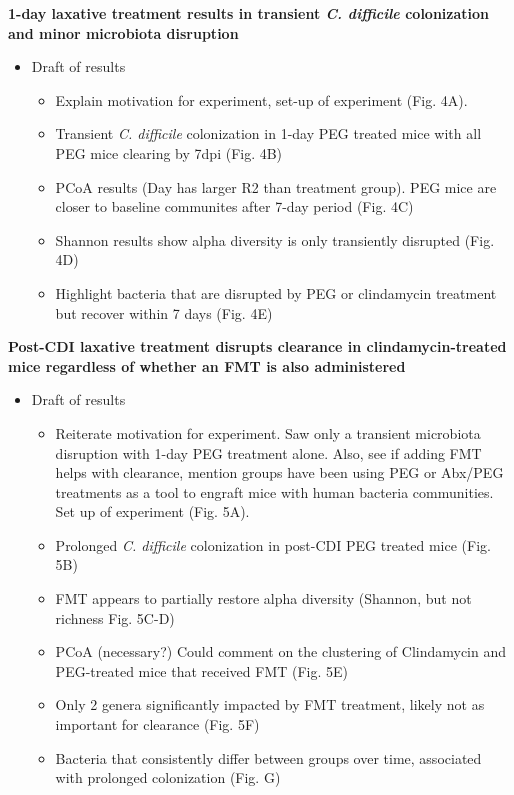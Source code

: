 \documentclass[
  11pt,
]{article}
\providecommand{\tightlist}{%
  \setlength{\itemsep}{0pt}\setlength{\parskip}{0pt}}
\begin{document}
\textbf{1-day laxative treatment results in transient \emph{C.
difficile} colonization and minor microbiota disruption}

\begin{itemize}
\tightlist
\item
  Draft of results

  \begin{itemize}
  \tightlist
  \item
    Explain motivation for experiment, set-up of experiment (Fig. 4A).
  \item
    Transient \emph{C. difficile} colonization in 1-day PEG treated mice
    with all PEG mice clearing by 7dpi (Fig. 4B)
  \item
    PCoA results (Day has larger R2 than treatment group). PEG mice are
    closer to baseline communites after 7-day period (Fig. 4C)
  \item
    Shannon results show alpha diversity is only transiently disrupted
    (Fig. 4D)
  \item
    Highlight bacteria that are disrupted by PEG or clindamycin
    treatment but recover within 7 days (Fig. 4E)
  \end{itemize}
\end{itemize}

\textbf{Post-CDI laxative treatment disrupts clearance in
clindamycin-treated mice regardless of whether an FMT is also
administered}

\begin{itemize}
\tightlist
\item
  Draft of results

  \begin{itemize}
  \tightlist
  \item
    Reiterate motivation for experiment. Saw only a transient microbiota
    disruption with 1-day PEG treatment alone. Also, see if adding FMT
    helps with clearance, mention groups have been using PEG or Abx/PEG
    treatments as a tool to engraft mice with human bacteria
    communities. Set up of experiment (Fig. 5A).
  \item
    Prolonged \emph{C. difficile} colonization in post-CDI PEG treated
    mice (Fig. 5B)
  \item
    FMT appears to partially restore alpha diversity (Shannon, but not
    richness Fig. 5C-D)
  \item
    PCoA (necessary?) Could comment on the clustering of Clindamycin and
    PEG-treated mice that received FMT (Fig. 5E)
  \item
    Only 2 genera significantly impacted by FMT treatment, likely not as
    important for clearance (Fig. 5F)
  \item
    Bacteria that consistently differ between groups over time,
    associated with prolonged colonization (Fig. G)
  \end{itemize}
\end{itemize}
\end{document}
